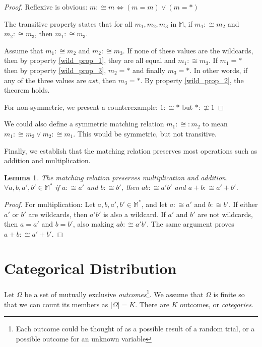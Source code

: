 \documentclass[twoside]{article}
\theoremstyle{plain}%
\newtheorem{lemma}[theorem]{Lemma}
\theoremstyle{definition}
\theoremstyle{remark}
\begin{document}
\begin{proof}
Reflexive is obvious: \(m :\cong m \Longleftrightarrow (m = m) \vee (m = \ast)\)

The transitive property states that for all \(m_1, m_2, m_3\) in \(\mathbb{M}\), if \(m_1 :\cong m_2\) and \(m_2 :\cong m_3\), then \(m_1 :\cong m_3\).

Assume that \(m_1 :\cong m_2\) and \(m_2 :\cong m_3\). If none of these values are the wildcards, then by property \ref{wild_prop_1}, they are all equal and \(m_1 :\cong m_3\). If \(m_1 = \ast\) then by property \ref{wild_prop_3}, \(m_2 = \ast\) and finally \(m_3 = \ast\). In other words, if any of the three values are \(ast\), then \(m_3 = \ast\). By property \ref{wild_prop_2}, the theorem holds.

For non-symmetric, we present a counterexample: \(1 :\cong \ast\) but \(\ast :\ncong 1\)
\end{proof}

We could also define a symmetric matching relation \(m_1 :\cong: m_2\) to mean \(m_1 :\cong m_2 \vee m_2 :\cong m_1\). This would be symmetric, but not transitive.

Finally, we establish that the matching relation preserves most operations such as addition and multiplication.

\begin{lemma}
\label{lemma:matching_multiplication}
The matching relation preserves multiplication and addition. \(\forall a,b,a',b' \in \mathbb{M^*}\) if \(a :\cong a'\) and \(b :\cong b'\), then \(ab :\cong a'b'\) and \(a+b :\cong a'+b'\).
\end{lemma}

\begin{proof}
For multiplication: Let \(a,b,a',b' \in \mathbb{M^*}\), and let \(a :\cong a'\) and \(b :\cong b'\). If either \(a'\) or \(b'\) are wildcards, then \(a'b'\) is also a wildcard. If \(a'\) and \(b'\) are not wildcards, then \(a = a'\) and \(b = b'\), also making \(ab :\cong a'b'\).
The same argument proves \(a+b :\cong a'+b'\).
\end{proof}

\section{Categorical Distribution}

Let \(\Omega\) be a set of mutually exclusive \textit{outcomes}\footnote{Each outcome could be thought of as a possible result of a random trial, or a possible outcome for an unknown variable}. We assume that \(\Omega\) is finite so that we can count its members as \(|\Omega| = K\). There are \(K\) outcomes, or \textit{categories}.
\end{document}
